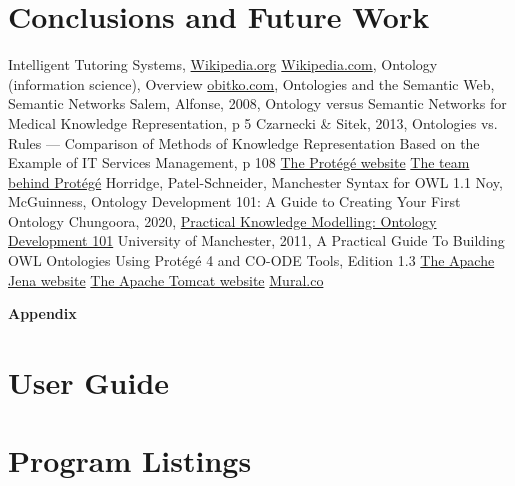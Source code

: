 \documentclass[12pt]{report}
\begin{document}
	\chapter{Conclusions and Future Work}
	
	\begin{thebibliography}{99}
		 Intelligent Tutoring Systems, \href{https://en.wikipedia.org/wiki/Intelligent_tutoring_system}{Wikipedia.org}
		 \href{https://en.wikipedia.org/wiki/Ontology_(information_science)}{Wikipedia.com}, Ontology (information science), Overview
         \href{https://www.obitko.com/tutorials/ontologies-semantic-web/semantic-networks.html}{obitko.com}, Ontologies and the Semantic Web, Semantic Networks
        Salem, Alfonse, 2008, Ontology versus Semantic Networks for Medical Knowledge
Representation, p 5
        Czarnecki \& Sitek, 2013, Ontologies vs. Rules — Comparison of Methods of Knowledge Representation Based on the Example of IT Services Management, p 108
        \href{https://protege.stanford.edu/}{The Protégé website}
        \href{https://protege.stanford.edu/about.php}{The team behind Protégé}
        Horridge, Patel-Schneider, Manchester Syntax for OWL 1.1
        Noy, McGuinness, Ontology Development 101: A Guide to Creating Your First Ontology
         Chungoora, 2020, \href{Practical Knowledge Modelling: Ontology Development 101}{Practical Knowledge Modelling: Ontology Development 101}
         University of Manchester, 2011, A Practical Guide To Building OWL Ontologies Using Protégé 4 and CO-ODE Tools, Edition 1.3
        \href{https://jena.apache.org/}{The Apache Jena website}
        \href{http://tomcat.apache.org/}{The Apache Tomcat website}
        \href{https://www.mural.co/}{Mural.co}

	\end{thebibliography}
	
	\newpage
	\begin{center}
		\textbf{\large{Appendix}}
	\end{center}
	
	\chapter{User Guide}
	
	\chapter{Program Listings}
	
\end{document}
